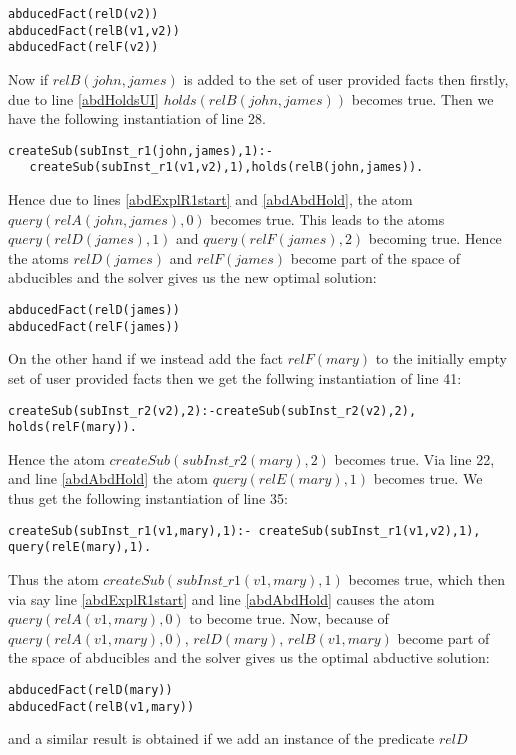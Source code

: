 \begin{lstlisting}[frame=none]
abducedFact(relD(v2)) 
abducedFact(relB(v1,v2)) 
abducedFact(relF(v2))    
\end{lstlisting}
Now if $relB(john,james)$ is added to the set of user provided facts then firstly, due to line \ref{abdHoldsUI} $holds(relB(john,james))$ becomes true. Then we have the following instantiation of line 28.
\begin{lstlisting}[frame=none]
createSub(subInst_r1(john,james),1):-
   createSub(subInst_r1(v1,v2),1),holds(relB(john,james)). 
\end{lstlisting}
Hence due to lines \ref{abdExplR1start} and \ref{abdAbdHold}, the atom
$query(relA(john,james),0)$ becomes true. This leads to the atoms
$query(relD(james),1)$ and $query(relF(james),2)$ becoming true. Hence the atoms $relD(james)$ and $relF(james)$ become part of the space of abducibles and the solver gives us the new optimal solution:
\begin{lstlisting}[frame=none]
abducedFact(relD(james)) 
abducedFact(relF(james)) 
\end{lstlisting}
On the other hand if we instead add the fact $relF(mary)$ to the initially empty set of user provided facts then we get the follwing instantiation of line 41:
\begin{lstlisting}[frame=none]
createSub(subInst_r2(v2),2):-createSub(subInst_r2(v2),2),
holds(relF(mary)).
\end{lstlisting}
Hence the atom $createSub(subInst\_r2(mary),2)$ becomes true. Via line 22, and line \ref{abdAbdHold} the atom $query(relE(mary),1)$ becomes true. We thus get the following instantiation of line 35:
\begin{lstlisting}[frame=none]
createSub(subInst_r1(v1,mary),1):- createSub(subInst_r1(v1,v2),1), query(relE(mary),1).   
\end{lstlisting}
Thus the atom $createSub(subInst\_r1(v1,mary),1)$ becomes true, which then via say line \ref{abdExplR1start} and line \ref{abdAbdHold} causes the atom\\ 
$query(relA(v1,mary),0)$ to become true. Now, because of\\ $query(relA(v1,mary),0)$, 
$relD(mary)$, $relB(v1,mary)$ become part of the space of abducibles and the solver gives us the optimal abductive solution: 
\begin{lstlisting}[frame=none]
abducedFact(relD(mary)) 
abducedFact(relB(v1,mary))
\end{lstlisting}
and a similar result is obtained if we add an instance of the predicate $relD$
